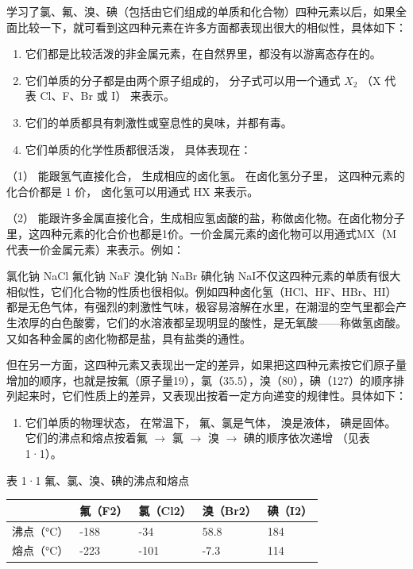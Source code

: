 学习了氯、氟、溴、碘（包括由它们组成的单质和化合物）四种元素以后，如果全面比较一下，就可看到这四种元素在许多方面都表现出很大的相似性，具体如下：

\begin{enumerate}
\item
  它们都是比较活泼的非金属元素，在自然界里，都没有以游离态存在的。
\item
  它们单质的分子都是由两个原子组成的， 分子式可以用一个通式 \(X_{2}\)
  （X 代表 Cl、F、Br 或 I） 来表示。
\item
  它们的单质都具有刺激性或窒息性的臭味，并都有毒。
\item
  它们单质的化学性质都很活泼， 具体表现在：
\end{enumerate}

（1） 能跟氢气直接化合， 生成相应的卤化氢。 在卤化氢分子里，
这四种元素的化合价都是 1 价， 卤化氢可以用通式 HX 来表示。

（2）
能跟许多金属直接化合，生成相应氢卤酸的盐，称做卤化物。在卤化物分子里，这四种元素的化合价也都是1价。一价金属元素的卤化物可以用通式MX（M代表一价金属元素）来表示。例如：

氯化钠 NaCl 氟化钠 NaF 溴化钠 NaBr 碘化钠
NaI不仅这四种元素的单质有很大相似性，它们化合物的性质也很相似。例如四种卤化氢（HCl、HF、HBr、HI）都是无色气体，有强烈的刺激性气味，极容易溶解在水里，在潮湿的空气里都会产生浓厚的白色酸雾，它们的水溶液都呈现明显的酸性，是无氧酸------称做氢卤酸。又如各种金属的卤化物都是盐，具有盐类的通性。

但在另一方面，这四种元素又表现出一定的差异，如果把这四种元素按它们原子量增加的顺序，也就是按氟（原子量19），氯（35.5），溴（80），碘（127）的顺序排列起来时，它们性质上的差异，又表现出按着一定方向递变的规律性。具体如下：

\begin{enumerate}
\item
  它们单质的物理状态， 在常温下， 氟、氯是气体， 溴是液体，
  碘是固体。它们的沸点和熔点按着氟 \(\rightarrow\) 氯 \(\rightarrow\) 溴
  \(\rightarrow\) 碘的顺序依次递增 （见表 1·1）。
\end{enumerate}

表 1·1 氟、氯、溴、碘的沸点和熔点

{\def\LTcaptype{none} %
\begin{longtable}[]{@{}lllll@{}}
\toprule\noalign{}
& 氟（F2） & 氯（Cl2） & 溴（Br2） & 碘（I2） \\
\midrule\noalign{}
\endhead
\bottomrule\noalign{}
\endlastfoot
沸点（°C） & -188 & -34 & 58.8 & 184 \\
熔点（°C） & -223 & -101 & -7.3 & 114 \\
\end{longtable}
}


